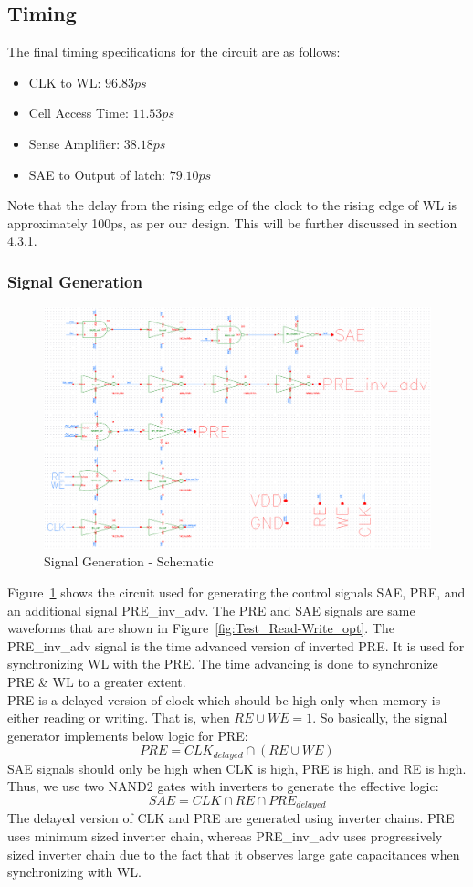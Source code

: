 \documentclass[10pt,letterpaper,onecolumn]{article}
\begin{document}
\subsection{Timing}
The final timing specifications for the circuit are as follows:
\begin{itemize}
  \item CLK to WL: $96.83ps$
  \item Cell Access Time: $11.53ps$
  \item Sense Amplifier: $38.18ps$
  \item SAE to Output of latch: $79.10ps$
\end{itemize}
Note that the delay from the rising edge of the clock to the rising edge of WL is approximately 100ps, as per our design. This will be further discussed in section 4.3.1. 
\subsubsection{Signal Generation}
\begin{figure}[h!]
\centering
\includegraphics[clip,width=0.9\columnwidth]{SIGNAL_GEN.png}
\caption{Signal Generation - Schematic}
\label{fig:signal_gen}
\end{figure}
Figure~\ref{fig:signal_gen} shows the circuit used for generating the control signals SAE, PRE, and an additional signal PRE\_inv\_adv. The PRE and SAE signals are same waveforms that are shown in Figure~\ref{fig:Test_Read-Write_opt}. The PRE\_inv\_adv signal is the time advanced version of inverted PRE. It is used for synchronizing WL with the PRE. The time advancing is done to synchronize PRE \& WL to a greater extent. \\
PRE is a delayed version of clock which should be high only when memory is either reading or writing. That is, when $RE \cup WE = 1$. So basically, the signal generator implements below logic for PRE: 
\[
    PRE = CLK_{delayed}\cap (RE\cup WE)
\]
SAE signals should only be high when CLK is high, PRE is high, and RE is high. Thus, we use two NAND2 gates with inverters to generate the effective logic:
\[
    SAE = CLK\cap RE\cap PRE_{delayed}
\]
The delayed version of CLK and PRE are generated using inverter chains. PRE uses minimum sized inverter chain, whereas PRE\_inv\_adv uses progressively sized inverter chain due to the fact that it observes large gate capacitances when synchronizing with WL. 
\end{document}
